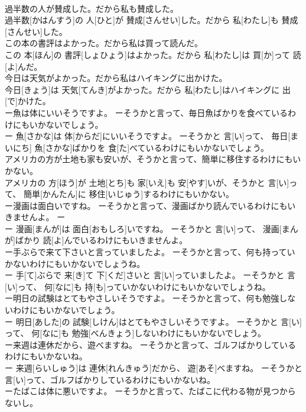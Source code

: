 \documentclass[8pt]{extreport}
\begin{document}
\begin{CJK}{UTF8}{min}
\\	過半数の人が賛成した。だから私も賛成した。	
\\	過半数[かはんすう]の 人[ひと]が 賛成[さんせい]した。だから 私[わたし]も 賛成[さんせい]した。
\\	この本の書評はよかった。だから私は買って読んだ。	
\\	この 本[ほん]の 書評[しょひょう]はよかった。だから 私[わたし]は 買[か]って 読[よ]んだ。
\\	今日は天気がよかった。だから私はハイキングに出かけた。	
\\	今日[きょう]は 天気[てんき]がよかった。だから 私[わたし]はハイキングに 出[で]かけた。
\\	ー魚は体にいいそうですよ。 ーそうかと言って、毎日魚ばかりを食べているわけにもいかないでしょう。	
\\	ー 魚[さかな]は 体[からだ]にいいそうですよ。 ーそうかと 言[い]って、 毎日[まいにち] 魚[さかな]ばかりを 食[た]べているわけにもいかないでしょう。
\\	アメリカの方が土地も家も安いが、そうかと言って、簡単に移住するわけにもいかない。	
\\	アメリカの 方[ほう]が 土地[とち]も 家[いえ]も 安[やす]いが、そうかと 言[い]って、 簡単[かんたん]に 移住[いじゅう]するわけにもいかない。
\\	ー漫画は面白いですね。 ーそうかと言って、漫画ばかり読んでいるわけにもいきませんよ。	ー
\\	ー 漫画[まんが]は 面白[おもしろ]いですね。 ーそうかと 言[い]って、 漫画[まんが]ばかり 読[よ]んでいるわけにもいきませんよ。
\\	ー手ぶらで来て下さいと言っていましたよ。 ーそうかと言って、何も持っていかないわけにもいかないでしょうね。	
\\	ー 手[て]ぶらで 来[き]て 下[くだ]さいと 言[い]っていましたよ。 ーそうかと 言[い]って、 何[なに]も 持[も]っていかないわけにもいかないでしょうね。
\\	ー明日の試験はとてもやさしいそうですよ。 ーそうかと言って、何も勉強しないわけにもいかないでしょう。	
\\	ー 明日[あした]の 試験[しけん]はとてもやさしいそうですよ。 ーそうかと 言[い]って、 何[なに]も 勉強[べんきょう]しないわけにもいかないでしょう。
\\	ー来週は連休だから、遊べますね。 ーそうかと言って、ゴルフばかりしているわけにもいかないね。	
\\	ー 来週[らいしゅう]は 連休[れんきゅう]だから、 遊[あそ]べますね。 ーそうかと 言[い]って、ゴルフばかりしているわけにもいかないね。
\\	ーたばこは体に悪いですよ。 ーそうかと言って、たばこに代わる物が見つからないし。	

\end{CJK}
\end{document}
